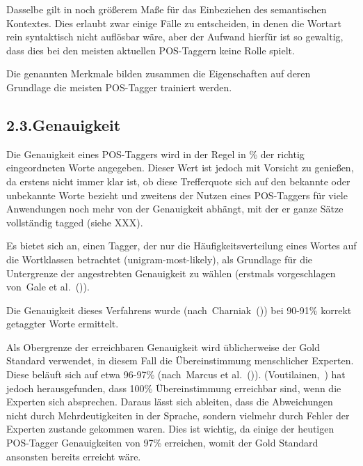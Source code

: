 \documentclass{article}
\begin{document}
Dasselbe gilt in noch größerem Maße für das Einbeziehen des semantischen Kontextes. Dies erlaubt zwar einige Fälle zu entscheiden, in denen die Wortart rein syntaktisch nicht auflösbar wäre, aber der Aufwand hierfür ist so gewaltig, dass dies bei den meisten aktuellen POS-Taggern keine Rolle spielt.%

Die genannten Merkmale bilden zusammen die Eigenschaften auf deren Grundlage die meisten POS-Tagger trainiert werden.%

\subsection{2.3.\hspace*{0.5em}Genauigkeit}\label{sec-genauigkeit}%

\noindent{}Die Genauigkeit eines POS-Taggers wird in der Regel in \% der richtig eingeordneten Worte angegeben. Dieser Wert ist jedoch mit Vorsicht zu genießen, da erstens nicht immer klar ist, ob diese Trefferquote sich auf den bekannte oder unbekannte Worte bezieht und zweitens der Nutzen eines POS-Taggers für viele Anwendungen noch mehr von der Genauigkeit abhängt, mit der er ganze Sätze vollständig tagged (siehe XXX).%

Es bietet sich an, einen Tagger, der nur die Häufigkeitsverteilung eines Wortes auf die Wortklassen betrachtet (unigram-most-likely), als Grundlage für die Untergrenze der angestrebten Genauigkeit zu wählen (erstmals vorgeschlagen von~Gale et al.~()).%

Die Genauigkeit dieses Verfahrens wurde (nach~Charniak~()) bei 90-91\% korrekt getaggter Worte ermittelt.%

Als Obergrenze der erreichbaren Genauigkeit wird üblicherweise der Gold Standard verwendet, in diesem Fall die Übereinstimmung menschlicher Experten. Diese beläuft sich auf etwa 96-97\% (nach~Marcus et al.~()).
(Voutilainen,~) hat jedoch herausgefunden, dass 100\% Übereinstimmung erreichbar sind, wenn die Experten sich absprechen. Daraus lässt sich ableiten, dass die Abweichungen nicht durch Mehrdeutigkeiten in der Sprache, sondern vielmehr durch Fehler der Experten zustande gekommen waren.
Dies ist wichtig, da einige der heutigen POS-Tagger Genauigkeiten von 97\% erreichen, womit der Gold Standard ansonsten bereits erreicht wäre.%
\end{document}
